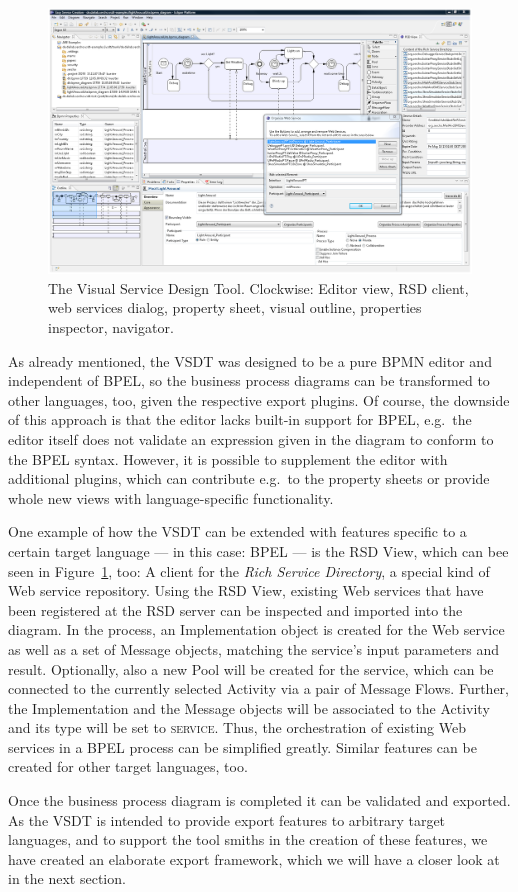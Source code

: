 \begin{figure}%
	\centering
	\includegraphics[width=\textwidth]{img/vsdt_080515.png}
	\caption{The Visual Service Design Tool. Clockwise: Editor view, RSD client, web services dialog, property sheet, visual outline, properties inspector, navigator.}
	\label{fig:screen}
\end{figure}

As already mentioned, the VSDT was designed to be a pure BPMN editor and independent of BPEL, so the business process diagrams can be transformed to other languages, too, given the respective export plugins. Of course, the downside of this approach is that the editor lacks built-in support for BPEL, e.g.\ the editor itself does not validate an expression given in the diagram to conform to the BPEL syntax.  However, it is possible to supplement the editor with additional plugins, which can contribute e.g.\ to the property sheets or provide whole new views with language-specific functionality.

One example of how the VSDT can be extended with features specific to a certain target language --- in this case: BPEL --- is the RSD View, which can bee seen in Figure~\ref{fig:screen}, too: A client for the \emph{Rich Service Directory}, a special kind of Web service repository. Using the RSD View, existing Web services that have been registered at the RSD server can be inspected and imported into the diagram.  In the process, an Implementation object is created for the Web service as well as a set of Message objects, matching the service's input parameters and result. Optionally, also a new Pool will be created for the service, which can be connected to the currently selected Activity via a pair of Message Flows.  Further, the Implementation and the Message objects will be associated to the Activity and its type will be set to \textsc{service}.  Thus, the orchestration of existing Web services in a BPEL process can be simplified greatly.  Similar features can be created for other target languages, too.

Once the business process diagram is completed it can be validated and exported.  As the VSDT is intended to provide export features to arbitrary target languages, and to support the tool smiths in the creation of these features, we have created an elaborate export framework, which we will have a closer look at in the next section.
